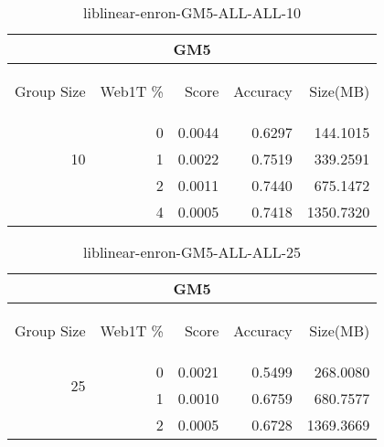 \begin{center}
\begin{table}[htbp]
\begin{tabular}{ | r | r | r | r | r |}
\hline
\multicolumn{5}{|c|}{GM5}\\
\hline
\begin{sideways}Group Size\end{sideways} & \begin{sideways}Web1T \%\end{sideways} & \begin{sideways}Score\end{sideways} & \begin{sideways}Accuracy\end{sideways} & \begin{sideways}Size(MB)\end{sideways}\\
\hline
\multirow{3}{*}{10}
 & 0 & 0.0044 & 0.6297 & 144.1015\\ \cline{2-5}
 & 1 & 0.0022 & 0.7519 & 339.2591\\ \cline{2-5}
 & 2 & 0.0011 & 0.7440 & 675.1472\\ \cline{2-5}
 & 4 & 0.0005 & 0.7418 & 1350.7320\\ \cline{2-5}
\hline
\end{tabular}
\caption{liblinear-enron-GM5-ALL-ALL-10}
\label{table:liblinear-enron-GM5-ALL-ALL-10}
\end{table}
\end{center}

\begin{center}
\begin{table}[htbp]
\begin{tabular}{ | r | r | r | r | r |}
\hline
\multicolumn{5}{|c|}{GM5}\\
\hline
\begin{sideways}Group Size\end{sideways} & \begin{sideways}Web1T \%\end{sideways} & \begin{sideways}Score\end{sideways} & \begin{sideways}Accuracy\end{sideways} & \begin{sideways}Size(MB)\end{sideways}\\
\hline
\multirow{2}{*}{25}
 & 0 & 0.0021 & 0.5499 & 268.0080\\ \cline{2-5}
 & 1 & 0.0010 & 0.6759 & 680.7577\\ \cline{2-5}
 & 2 & 0.0005 & 0.6728 & 1369.3669\\ \cline{2-5}
\hline
\end{tabular}
\caption{liblinear-enron-GM5-ALL-ALL-25}
\label{table:liblinear-enron-GM5-ALL-ALL-25}
\end{table}
\end{center}

